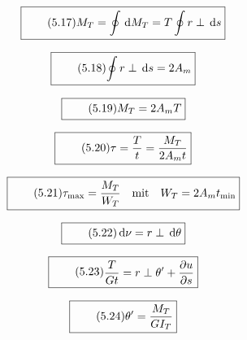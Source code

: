 \documentclass[11pt]{article}
\newcommand{\1}{ {\mathds{1}} }
\newcommand{\td}{\,\text{d}}
\begin{document}
\begin{multicols}{2}
		\begin{equation}
			\boxed{
				\tag{5.17}
				\begin{split}
					M_T = \oint \td M_T = T \oint r \perp\td s
				\end{split}
			}
		\end{equation}

		\begin{equation}
			\boxed{
				\tag{5.18}
				\begin{split}
					\oint r \perp \td s = 2 A_m
				\end{split}
			}
		\end{equation}

		\begin{equation}
			\boxed{
				\tag{5.19}
				\begin{split}
					M_T = 2A_m T
				\end{split}
			}
		\end{equation}

		\begin{equation}
			\boxed{
				\tag{5.20}
				\begin{split}
					\tau = \frac{T}{t} = \frac{M_T}{2 A_m t}
				\end{split}
			}
		\end{equation}

		\begin{equation}
			\boxed{
				\tag{5.21}
				\begin{split}
					\tau_{\text{max}} = \frac{M_T}{W_T} \quad \text{mit} \quad W_T = 2 A_m t_{\text{min}}
				\end{split}
			}
		\end{equation}

		\begin{equation}
			\boxed{
				\tag{5.22}
				\begin{split}
					\td \nu = r \perp \td \theta
				\end{split}
			}
		\end{equation}

		\begin{equation}
			\boxed{
				\tag{5.23}
				\begin{split}
					\frac{T}{G t} = r \perp \theta' + \frac{\partial u}{\partial s}
				\end{split}
			}
		\end{equation}

		\begin{equation}
			\boxed{
				\tag{5.24}
				\begin{split}
					\theta' = \frac{M_T}{GI_T}
				\end{split}
			}
		\end{equation}


\end{multicols}
\end{document}
